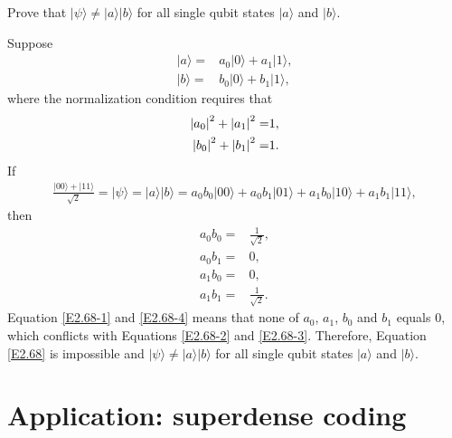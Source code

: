\documentclass[en]{sol-man}
\begin{document}
\begin{exe}
    Prove that $\lvert\psi\rangle\neq\lvert a\rangle\lvert b\rangle$ for all single qubit states $\lvert a\rangle$ and $\lvert b\rangle$.
\end{exe}
\begin{pf}
    Suppose
    \begin{align}
        \lvert a\rangle=&a_0\lvert 0\rangle+a_1\lvert 1\rangle,\\
        \lvert b\rangle=&b_0\lvert 0\rangle+b_1\lvert 1\rangle,
    \end{align}
    where the normalization condition requires that
    \begin{align}
        \left\lvert a_0\right\rvert^2+\left\lvert a_1\right\rvert^2=&1,\\
        \left\lvert b_0\right\rvert^2+\left\lvert b_1\right\rvert^2=&1.
    \end{align}
    If
    \begin{align}
        \label{E2.68}
        \frac{\lvert 00\rangle+\lvert 11\rangle}{\sqrt{2}}=\lvert\psi\rangle=\lvert a\rangle\lvert b\rangle=a_0b_0\lvert 00\rangle+a_0b_1\lvert 01\rangle+a_1b_0\lvert 10\rangle+a_1b_1\lvert 11\rangle,
    \end{align}
    then
    \begin{align}
        \label{E2.68-1}a_0b_0=&\frac{1}{\sqrt{2}},\\
        \label{E2.68-2}a_0b_1=&0,\\
        \label{E2.68-3}a_1b_0=&0,\\
        \label{E2.68-4}a_1b_1=&\frac{1}{\sqrt{2}}.
    \end{align}
    Equation \eqref{E2.68-1} and \eqref{E2.68-4} means that none of $a_0$, $a_1$, $b_0$ and $b_1$ equals $0$, which conflicts with Equations \eqref{E2.68-2} and \eqref{E2.68-3}.
    Therefore, Equation \eqref{E2.68} is impossible and $\lvert\psi\rangle\neq\lvert a\rangle\lvert b\rangle$ for all single qubit states $\lvert a\rangle$ and $\lvert b\rangle$.
\end{pf}

\section{Application: superdense coding}
\end{document}
